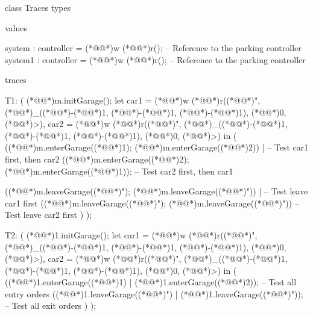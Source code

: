 \documentclass[a4paper]{article}
\begin{document}
\title{}
\author{}
\begin{vdm_al}
class Traces
types

values

    system : controller = (*@@*)w (*@@*)r();  -- Reference to the parking controller
    system1 : controller = (*@@*)w (*@@*)r();  -- Reference to the parking controller

traces

T1:
(
    (*@@*)m.initGarage();
    let car1 = (*@@*)w (*@@*)r((*@@*)", (*@@*)_((*@\vdmnotcovered{}@*)-(*@\vdmnotcovered{}@*)1, (*@\vdmnotcovered{}@*)-(*@\vdmnotcovered{}@*)1, (*@\vdmnotcovered{}@*)-(*@\vdmnotcovered{}@*)1), (*@\vdmnotcovered{}@*)0, (*@@*)>),
        car2 = (*@@*)w (*@@*)r((*@@*)", (*@@*)_((*@\vdmnotcovered{}@*)-(*@\vdmnotcovered{}@*)1, (*@\vdmnotcovered{}@*)-(*@\vdmnotcovered{}@*)1, (*@\vdmnotcovered{}@*)-(*@\vdmnotcovered{}@*)1), (*@\vdmnotcovered{}@*)0, (*@@*)>) in
    (
        ((*@@*)m.enterGarage((*@@*)1); (*@@*)m.enterGarage((*@@*)2)) |  -- Test car1 first, then car2
        ((*@@*)m.enterGarage((*@@*)2); (*@@*)m.enterGarage((*@@*)1));  -- Test car2 first, then car1
        
        ((*@@*)m.leaveGarage((*@@*)"); (*@@*)m.leaveGarage((*@@*)")) |  -- Test leave car1 first
        ((*@@*)m.leaveGarage((*@@*)"); (*@@*)m.leaveGarage((*@@*)"))   -- Test leave car2 first
    )
);

T2:
(
    (*@@*)1.initGarage();
    let car1 = (*@@*)w (*@@*)r((*@@*)", (*@@*)_((*@\vdmnotcovered{}@*)-(*@\vdmnotcovered{}@*)1, (*@\vdmnotcovered{}@*)-(*@\vdmnotcovered{}@*)1, (*@\vdmnotcovered{}@*)-(*@\vdmnotcovered{}@*)1), (*@\vdmnotcovered{}@*)0, (*@@*)>),
        car2 = (*@@*)w (*@@*)r((*@@*)", (*@@*)_((*@\vdmnotcovered{}@*)-(*@\vdmnotcovered{}@*)1, (*@\vdmnotcovered{}@*)-(*@\vdmnotcovered{}@*)1, (*@\vdmnotcovered{}@*)-(*@\vdmnotcovered{}@*)1), (*@\vdmnotcovered{}@*)0, (*@@*)>) in
    (
        ((*@@*)1.enterGarage((*@@*)1) | (*@@*)1.enterGarage((*@@*)2));  -- Test all entry orders
        ((*@@*)1.leaveGarage((*@@*)") | (*@@*)1.leaveGarage((*@@*)"));  -- Test all exit orders
    )
);


\end{vdm_al}
\end{document}
